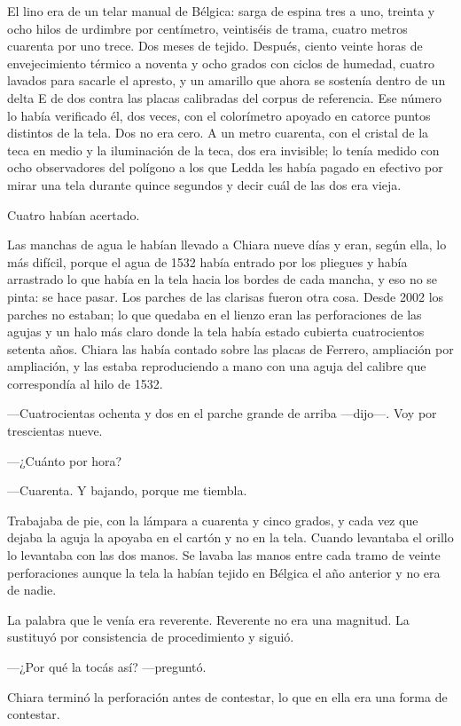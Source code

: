 El lino era de un telar manual de Bélgica: sarga de espina tres a uno, treinta y ocho hilos de urdimbre por centímetro, veintiséis de trama, cuatro metros cuarenta por uno trece. Dos meses de tejido. Después, ciento veinte horas de envejecimiento térmico a noventa y ocho grados con ciclos de humedad, cuatro lavados para sacarle el apresto, y un amarillo que ahora se sostenía dentro de un delta E de dos contra las placas calibradas del corpus de referencia. Ese número lo había verificado él, dos veces, con el colorímetro apoyado en catorce puntos distintos de la tela. Dos no era cero. A un metro cuarenta, con el cristal de la teca en medio y la iluminación de la teca, dos era invisible; lo tenía medido con ocho observadores del polígono a los que Ledda les había pagado en efectivo por mirar una tela durante quince segundos y decir cuál de las dos era vieja.

Cuatro habían acertado.

Las manchas de agua le habían llevado a Chiara nueve días y eran, según ella, lo más difícil, porque el agua de 1532 había entrado por los pliegues y había arrastrado lo que había en la tela hacia los bordes de cada mancha, y eso no se pinta: se hace pasar. Los parches de las clarisas fueron otra cosa. Desde 2002 los parches no estaban; lo que quedaba en el lienzo eran las perforaciones de las agujas y un halo más claro donde la tela había estado cubierta cuatrocientos setenta años. Chiara las había contado sobre las placas de Ferrero, ampliación por ampliación, y las estaba reproduciendo a mano con una aguja del calibre que correspondía al hilo de 1532.

---Cuatrocientas ochenta y dos en el parche grande de arriba ---dijo---. Voy por trescientas nueve.

---¿Cuánto por hora?

---Cuarenta. Y bajando, porque me tiembla.

Trabajaba de pie, con la lámpara a cuarenta y cinco grados, y cada vez que dejaba la aguja la apoyaba en el cartón y no en la tela. Cuando levantaba el orillo lo levantaba con las dos manos. Se lavaba las manos entre cada tramo de veinte perforaciones aunque la tela la habían tejido en Bélgica el año anterior y no era de nadie.

La palabra que le venía era reverente. Reverente no era una magnitud. La sustituyó por consistencia de procedimiento y siguió.

---¿Por qué la tocás así? ---preguntó.

Chiara terminó la perforación antes de contestar, lo que en ella era una forma de contestar.

